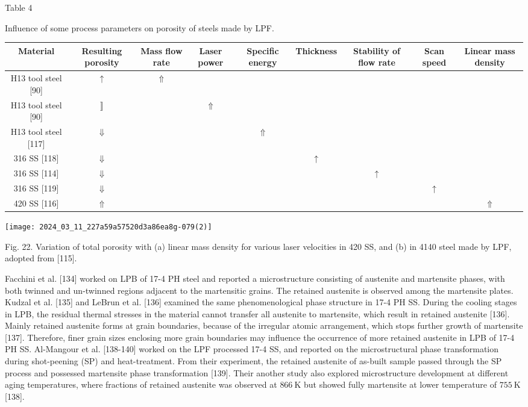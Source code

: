 \documentclass[10pt]{article}
\begin{document}
Table 4

Influence of some process parameters on porosity of steels made by LPF.

\begin{center}
\begin{tabular}{|c|c|c|c|c|c|c|c|c|}
\hline
Material & Resulting porosity & Mass flow rate & Laser power & Specific energy & Thickness & Stability of flow rate & Scan speed & Linear mass density \\
\hline
H13 tool steel [90] & $\uparrow$ & $\Uparrow$ &  &  &  &  &  &  \\
\hline
H13 tool steel [90] & $\rrbracket$ &  & $\Uparrow$ &  &  &  &  &  \\
\hline
H13 tool steel [117] & $\Downarrow$ &  &  & $\Uparrow$ &  &  &  &  \\
\hline
316 SS [118] & $\Downarrow$ &  &  &  & $\uparrow$ &  &  &  \\
\hline
316 SS [114] & $\Downarrow$ &  &  &  &  & $\uparrow$ &  &  \\
\hline
316 SS [119] & $\Downarrow$ &  &  &  &  &  & $\uparrow$ &  \\
\hline
420 SS [116] & $\Uparrow$ &  &  &  &  &  &  & $\Uparrow$ \\
\hline
\end{tabular}
\end{center}

\begin{center}
\texttt{[image: 2024\_03\_11\_227a59a57520d3a86ea8g-079(2)]}
\end{center}

Fig. 22. Variation of total porosity with (a) linear mass density for various laser velocities in 420 SS, and (b) in 4140 steel made by LPF, adopted from [115].

Facchini et al. [134] worked on LPB of 17-4 PH steel and reported a microstructure consisting of austenite and martensite phases, with both twinned and un-twinned regions adjacent to the martensitic grains. The retained austenite is observed among the martensite plates. Kudzal et al. [135] and LeBrun et al. [136] examined the same phenomenological phase structure in 17-4 PH SS. During the cooling stages in LPB, the residual thermal stresses in the material cannot transfer all austenite to martensite, which result in retained austenite [136]. Mainly retained austenite forms at grain boundaries, because of the irregular atomic arrangement, which stops further growth of martensite [137]. Therefore, finer grain sizes enclosing more grain boundaries may influence the occurrence of more retained austenite in LPB of 17-4 PH SS. Al-Mangour et al. [138-140] worked on the LPF processed 17-4 SS, and reported on the microstructural phase transformation during shot-peening (SP) and heat-treatment. From their experiment, the retained austenite of as-built sample passed through the SP process and possessed martensite phase transformation [139]. Their another study also explored microstructure development at different aging temperatures, where fractions of retained austenite was observed at $866 \mathrm{~K}$ but showed fully martensite at lower temperature of $755 \mathrm{~K}$ [138].
\end{document}
